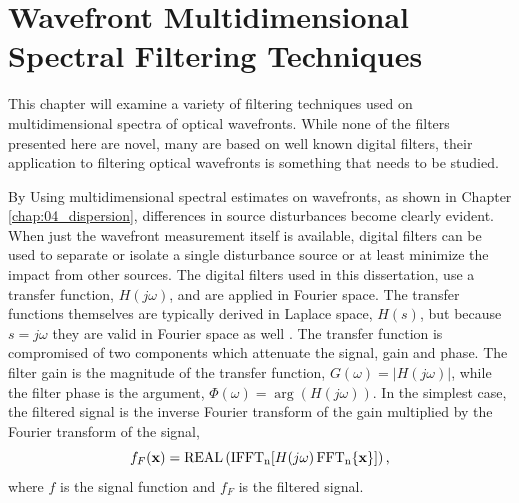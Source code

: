 
\chapter{Wavefront Multidimensional Spectral Filtering Techniques}
\label{chap:06_single_filter}

This chapter will examine a variety of filtering techniques used on multidimensional spectra of optical wavefronts.
While none of the filters presented here are novel, many are based on well known digital filters, their application to filtering optical wavefronts is something that needs to be studied.

By Using multidimensional spectral estimates on wavefronts, as shown in Chapter \ref{chap:04_dispersion}, differences in source disturbances become clearly evident.
When just the wavefront measurement itself is available, digital filters can be used to separate or isolate a single disturbance source or at least minimize the impact from other sources.
The digital filters used in this dissertation, use a transfer function, $H(j\omega)$, and are applied in Fourier space.
The transfer functions themselves are typically derived in Laplace space, $H(s)$, but because $s=j\omega$ they are valid in Fourier space as well \cite{Hamming-1998-CdhcDuvZ}.
The transfer function is compromised of two components which attenuate the signal, gain and phase.
The filter gain is the magnitude of the transfer function, $G(\omega) = |H(j\omega)|$, while the filter phase is the argument, $\Phi(\omega) = \arg(H(j\omega))$.
In the simplest case, the filtered signal is the inverse Fourier transform of the gain multiplied by the Fourier transform of the signal,
\begin{equation}
 f_F(\mathbf{x}) = \operatorname{REAL}\left(\operatorname{IFFT_n}[H(j\mathbf{\omega})\operatorname{FFT_n}\{\mathbf{x}\}]\right) \textrm{,}
 \label{eqn:06_filter_function}
\end{equation}
where $f$ is the signal function and $f_F$ is the filtered signal.


